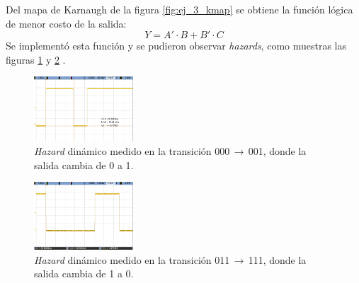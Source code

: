 \documentclass[../../e3_tp2_main.tex]{subfiles}
\begin{document}
Del mapa de Karnaugh de la figura \ref{fig:ej_3_kmap} se obtiene la funci\'on l\'ogica de menor costo de la salida:
$$Y = A'\cdot B+B'\cdot C$$
Se implement\'o esta funci\'on y se pudieron observar \textit{hazards}, como muestras las figuras \ref{fig:ej_3_up_haz} y \ref{fig:ej_3_down_haz} \protect\footnotemark. 

\begin{figure}[H]	%
	\centering
	\includegraphics[width=0.33\textwidth]{000-001_haz.png}
	\caption{\textit{Hazard} din\'amico medido en la transici\'on 000\,$\rightarrow$\,001, donde la salida cambia de 0 a 1.}
	\label{fig:ej_3_up_haz}
\end{figure}


\begin{figure}[H]	%
	\centering
	\includegraphics[width=0.33\textwidth]{011-111_haz.png}
	\caption{\textit{Hazard} din\'amico medido en la transici\'on 011\,$\rightarrow$\,111, donde la salida cambia de 1 a 0.}
	\label{fig:ej_3_down_haz}
\end{figure}



\end{document}
